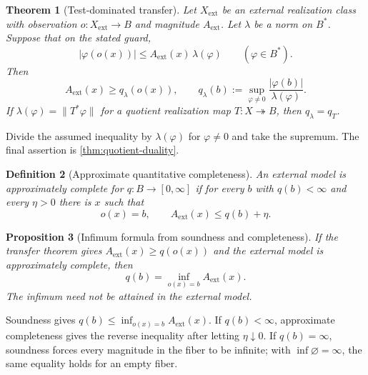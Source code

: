 \documentclass[12pt,a4paper,twoside]{extarticle}
\makeatletter
\theoremstyle{compactplain}
\newtheorem{theorem}{Theorem}[section]
\newtheorem{proposition}[theorem]{Proposition}
\theoremstyle{compactdef}
\newtheorem{definition}[theorem]{Definition}
\renewenvironment{proof}[1][\proofname]{\par\pushQED{\qed}\normalfont
  \topsep2pt\trivlist\item[\hskip\labelsep\bfseries #1\@addpunct{.}]\ignorespaces}
 {\popQED\endtrivlist\@endpefalse}
\newcommand{\onto}{\twoheadrightarrow}
\makeatother
\begin{document}
\begin{theorem}[Test-dominated transfer]\label{thm:test-transfer}
Let $X_{\mathrm{ext}}$ be an external realization class with observation $o:X_{\mathrm{ext}}\to B$ and magnitude $A_{\mathrm{ext}}$.  Let $\lambda$ be a norm on $B^*$.  Suppose that on the stated guard,
\[
  |\varphi(o(x))|\le A_{\mathrm{ext}}(x)\,\lambda(\varphi)
  \qquad(\varphi\in B^*).
\]
Then
\[
  A_{\mathrm{ext}}(x)\ge q_\lambda(o(x)),\qquad
  q_\lambda(b):=\sup_{\varphi\ne0}
  \frac{|\varphi(b)|}{\lambda(\varphi)}.
\]
If $\lambda(\varphi)=\|T^*\varphi\|$ for a quotient realization map $T:X\onto B$, then $q_\lambda=q_T$.
\end{theorem}
\begin{proof}
Divide the assumed inequality by $\lambda(\varphi)$ for $\varphi\ne0$ and take the supremum.  The final assertion is \cref{thm:quotient-duality}.
\end{proof}

\begin{definition}[Approximate quantitative completeness]
An external model is approximately complete for $q:B\to[0,\infty]$ if for every $b$ with $q(b)<\infty$ and every $\eta>0$ there is $x$ such that
\[
  o(x)=b,
  \qquad A_{\mathrm{ext}}(x)\le q(b)+\eta.
\]
\end{definition}

\begin{proposition}[Infimum formula from soundness and completeness]
If the transfer theorem gives $A_{\mathrm{ext}}(x)\ge q(o(x))$ and the external model is approximately complete, then
\[
  q(b)=\inf_{o(x)=b}A_{\mathrm{ext}}(x).
\]
The infimum need not be attained in the external model.
\end{proposition}
\begin{proof}
Soundness gives $q(b)\le\inf_{o(x)=b}A_{\mathrm{ext}}(x)$.  If $q(b)<\infty$, approximate completeness gives the reverse inequality after letting $\eta\downarrow0$.  If $q(b)=\infty$, soundness forces every magnitude in the fiber to be infinite; with $\inf\varnothing=\infty$, the same equality holds for an empty fiber.
\end{proof}
\end{document}

